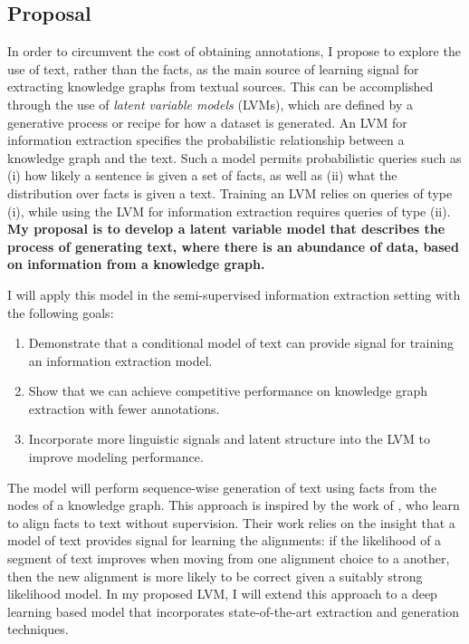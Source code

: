 \documentclass[12pt]{article}
\begin{document}
\subsection*{Proposal}
In order to circumvent the cost of obtaining annotations, I propose to explore the use of text, rather than the facts, as the main source of learning signal for extracting knowledge graphs from textual sources. This can be accomplished through the use of \textit{latent variable models} (LVMs), which are defined
by a generative process or recipe for how a dataset is generated.
An LVM for information extraction specifies the probabilistic relationship between a knowledge graph and the text. Such a model permits probabilistic queries such as (i) how likely a sentence is given a set of facts, as well as (ii) what the distribution over facts is given a text. Training an LVM relies on queries of type (i), while using the LVM for information extraction requires queries of type (ii). \textbf{My proposal is to develop a latent variable model that describes the process of generating text, where there is an abundance of data, based on information from a knowledge graph.} 

I will apply this model in the
semi-supervised information extraction setting
with the following goals:
\begin{enumerate}
\item Demonstrate that a conditional model of text can provide signal for training an information extraction model.
\item Show that we can achieve competitive performance on knowledge graph extraction with fewer annotations. 
\item Incorporate more linguistic signals and latent structure into the LVM to improve modeling performance.
\end{enumerate}
The model will perform sequence-wise generation of text using facts from the nodes of a knowledge graph.
This approach is inspired by the work of \citet{liang2009semalign}, who learn to align facts to text without supervision.
Their work relies on the insight that a model of text
provides signal for learning the alignments:
if the likelihood of a segment of text improves when moving from one alignment choice to a another,
then the new alignment is more likely to be correct given a suitably strong likelihood model. In my proposed LVM, I will extend this approach to a deep learning based model that incorporates state-of-the-art extraction and generation techniques.
\end{document}
